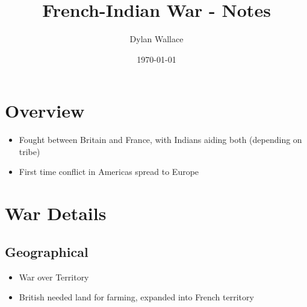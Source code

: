 \documentclass[letterpaper]{article}
\author{Dylan Wallace}
\date{\today}
\title{French-Indian War - Notes}
\renewcommand\maketitle{}
\begin{document}
\maketitle


\section{Overview}
\label{sec:org58a49a3}
\begin{itemize}
\item Fought between Britain and France, with Indians aiding both (depending on tribe)
\item First time conflict in Americas spread to Europe
\end{itemize}

\section{War Details}
\label{sec:org9cb8a3a}
\subsection{Geographical}
\label{sec:orgd2e75f8}
\begin{itemize}
\item War over Territory
\item British needed land for farming, expanded into French territory
\end{itemize}
\end{document}
